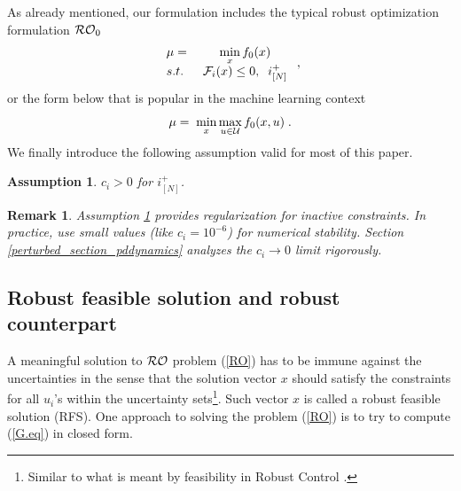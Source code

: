 \documentclass[journal,twoside,web]{ieeecolor}
\newcommand{\rev}[1]{\textcolor{revisionblue}{#1}}
\newtheorem{assumption}[theorem]{Assumption}
\newtheorem{remark}{Remark}
\begin{document}
As already mentioned, our formulation includes the typical robust optimization formulation ${\cal RO}_0$
\begin{equation}
\begin{array}{lcc}
\mu=&\;\displaystyle\min_x f_0(x)\\
s.t.&\; {\cal F}_i(x)\leq 0,\;\;i^+_{[N]}
\end{array}\;,
\label{RO3}
\end{equation}
or the form below that is popular in the machine learning context \cite{rafique2022,zhang2021}
\begin{equation}
\mu=\;\displaystyle\min_x\max_{u\in {\cal U}} f_0(x,u)\;.
\end{equation}
We finally introduce the following assumption valid for most of this paper.

\begin{assumption} \label{assume_c>0}
$c_i > 0$ for $i^+_{[N]}$.
\end{assumption}

\begin{remark} 
\rev{Assumption \ref{assume_c>0} provides regularization for inactive constraints. In practice, use small values (like $c_i = 10^{-6}$) for numerical stability. Section \ref{perturbed_section_pddynamics} analyzes the $c_i \to 0$ limit rigorously.}
\end{remark}

\subsection{Robust feasible solution and robust counterpart}
A meaningful solution to ${\cal RO}$ problem (\ref{RO}) has to be immune against the uncertainties in the sense that the solution vector $x$ should satisfy the constraints for all $u_i$'s within the uncertainty sets\footnote{Similar to what is meant by feasibility in Robust Control \cite{zhou1995}.}. Such vector $x$ is called a robust feasible solution (RFS). One approach to solving the problem (\ref{RO}) is to try to compute (\ref{G.eq}) in closed form.
\end{document}
